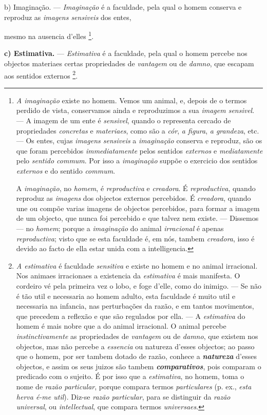b) Imaginação. --- \emph{Imaginação} é a faculdade, pela qual o   homem conserva e reproduz as \emph{imagens sensiveis} dos entes,

mesmo na ausencia d'elles \footnote{\emph{A imaginação} existe no homem. Vemos um animal, e, depois de o termos perdido de vista, conservamos ainda e reproduzimos a sua \emph{imagem sensivel}. --- A imagem de um ente é \emph{sensivel}, quando o representa cercado de propriedades \emph{concretas} e \emph{materiaes}, como são a \emph{cór}, \emph{a figura}, \emph{a grandeza}, etc. --- Os entes, cujas \emph{imagens sensiveis} a \emph{imaginação} conserva e reproduz, são os que foram percebidos \emph{immediatamente} pelos sentidos \emph{externos} e \emph{mediatamente} pelo \emph{sentido commum}. Por isso a \emph{imaginação} suppõe o exercicio dos sentidos \emph{externos} e do sentido \emph{commum}.\par A \emph{imaginação}, no \emph{homem}, é \emph{reproductiva} e \emph{creadora}. É \emph{reproductiva}, quando reproduz as \emph{imagens} dos objectos externos percebidos. É \emph{creadora}, quando une ou compõe varias imagens de objectos percebidos, para formar a imagem de um objecto, que nunca foi percebido e que talvez nem existe. --- Dissemos --- no \emph{homem}; porque a \emph{imaginação} do animal \emph{irracional} é apenas \emph{reproductiva}; visto que se esta faculdade é, em nós, tambem \emph{creadora}, isso é devido ao facto de ella estar unida com a intelligencia.}.

\textbf{c) Estimativa.} --- \emph{Estimativa} é a faculdade, pela qual o homem percebe nos objectos materiaes certas propriedades de \emph{vantagem} ou de \emph{damno}, que escapam aos sentidos externos \footnote{\emph{A estimativa} é faculdade \emph{sensitiva} e existe no homem e no animal irracional. Nos animaes irracionaes a existencia da \emph{estimativa} é mais manifesta. O cordeiro vé pela primeira vez o lobo, e foge d'elle, como do inimigo. --- Se não é tão util e necessaria ao homem adulto, esta faculdade é muito util e necessaria na infancia, nas perturbações da razão, e em tantos movimentos, que precedem a reflexão e que são regulados por ella. --- A \emph{estimativa} do homem é mais nobre que a do animal irracional. O animal percebe \emph{instinctivamente} as propriedades de \emph{vantagem} ou de \emph{damno}, que existem nos objectos, mas não percebe a \emph{essencia} ou natureza d'esses objectos; ao passo que o homem, por ser tambem dotado de razão, conhece a \textbf{\emph{natureza}} d'esses objectos, e assim os seus juizos são tambem \textbf{\emph{comparativos}}, pois comparam o predicado com o sujeito. É por isso que a \emph{estimativa}, no homem, toma o nome de \emph{razão particular}, porque compara termos \emph{particulares} (p. ex., \emph{esta herva é-me util}). Diz-se \emph{razão particular}, para se distinguir da \emph{razão universal}, ou \emph{intellectual}, que compara termos \emph{universaes}.}.

